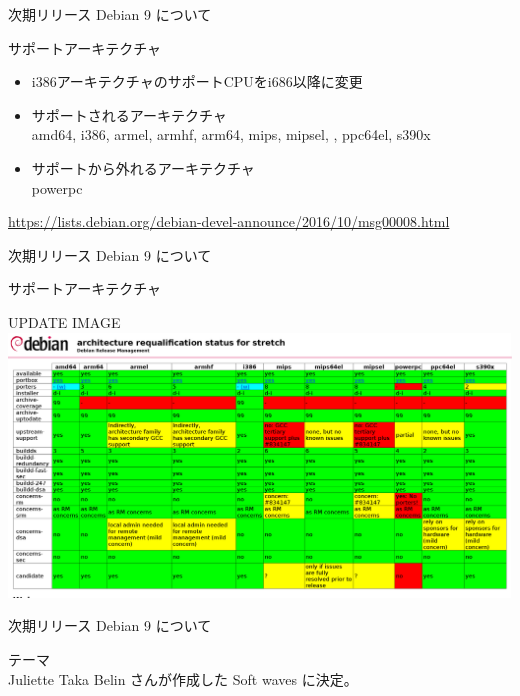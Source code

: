 \begin{frame}{次期リリース Debian 9 について}%

サポートアーキテクチャ
\begin{itemize}
\item i386アーキテクチャのサポートCPUをi686以降に変更
\item サポートされるアーキテクチャ \\
  amd64, i386, armel, armhf, arm64, mips, mipsel, {\color{red}{mips64el}}, ppc64el, s390x
\item サポートから外れるアーキテクチャ \\
  powerpc 
\end{itemize}

\tiny{\url{https://lists.debian.org/debian-devel-announce/2016/10/msg00008.html}}

\end{frame}

\begin{frame}{次期リリース Debian 9 について}%

サポートアーキテクチャ
 \begin{center}

UPDATE IMAGE
 \includegraphics[width=1.0\hsize]{image201611/stretch-arch-requalification.png}
 \end{center}

\end{frame}

\begin{frame}{次期リリース Debian 9 について}%

テーマ\\
Juliette Taka Belin さんが作成した Soft waves に決定。
 \begin{center}
 \end{center}

\end{frame}


